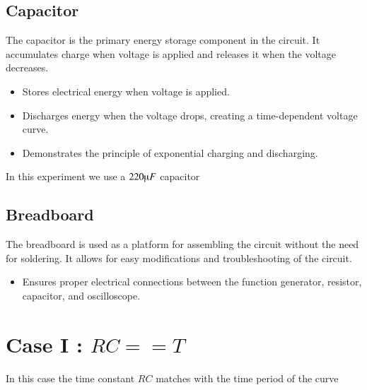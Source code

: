 \documentclass[journal]{IEEEtran}
\begin{document}
\subsection{Capacitor}
The capacitor is the primary energy storage component in the circuit. It accumulates charge when voltage is applied and releases it when the voltage decreases.
\begin{itemize}
    \item Stores electrical energy when voltage is applied.
    \item Discharges energy when the voltage drops, creating a time-dependent voltage curve.
    \item Demonstrates the principle of exponential charging and discharging.
\end{itemize}
In this experiment we use a $220 \micro F$ capacitor 
\subsection{Breadboard}
The breadboard is used as a platform for assembling the circuit without the need for soldering. It allows for easy modifications and troubleshooting of the circuit.
\begin{itemize}
    \item Ensures proper electrical connections between the function generator, resistor, capacitor, and oscilloscope.
\end{itemize}
\section{Case I : $RC==T$}
In this case the time constant $RC$ matches with the time period of the curve 
\end{document}

